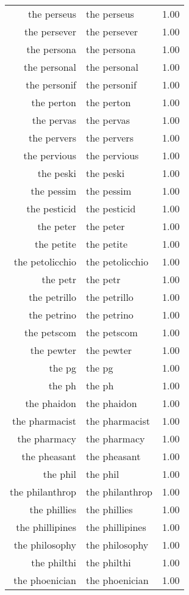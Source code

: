\begin{table}[ht]
\begin{tabular}{rlr}
  the perseus & the perseus & 1.00 \\ 
  the persever & the persever & 1.00 \\ 
  the persona & the persona & 1.00 \\ 
  the personal & the personal & 1.00 \\ 
  the personif & the personif & 1.00 \\ 
  the perton & the perton & 1.00 \\ 
  the pervas & the pervas & 1.00 \\ 
  the pervers & the pervers & 1.00 \\ 
  the pervious & the pervious & 1.00 \\ 
  the peski & the peski & 1.00 \\ 
  the pessim & the pessim & 1.00 \\ 
  the pesticid & the pesticid & 1.00 \\ 
  the peter & the peter & 1.00 \\ 
  the petite & the petite & 1.00 \\ 
  the petolicchio & the petolicchio & 1.00 \\ 
  the petr & the petr & 1.00 \\ 
  the petrillo & the petrillo & 1.00 \\ 
  the petrino & the petrino & 1.00 \\ 
  the petscom & the petscom & 1.00 \\ 
  the pewter & the pewter & 1.00 \\ 
  the pg & the pg & 1.00 \\ 
  the ph & the ph & 1.00 \\ 
  the phaidon & the phaidon & 1.00 \\ 
  the pharmacist & the pharmacist & 1.00 \\ 
  the pharmacy & the pharmacy & 1.00 \\ 
  the pheasant & the pheasant & 1.00 \\ 
  the phil & the phil & 1.00 \\ 
  the philanthrop & the philanthrop & 1.00 \\ 
  the phillies & the phillies & 1.00 \\ 
  the phillipines & the phillipines & 1.00 \\ 
  the philosophy & the philosophy & 1.00 \\ 
  the philthi & the philthi & 1.00 \\ 
  the phoenician & the phoenician & 1.00 \\ 

\end{tabular}
\end{table}
